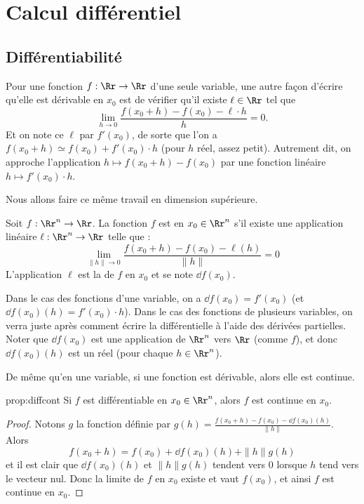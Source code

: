 
\section{Calcul différentiel}
\subsection{Différentiabilité}


Pour une fonction $f : \Rr \to \Rr$ d'une seule variable, une autre façon d'écrire qu'elle est dérivable en $x_0$ est de vérifier qu'il existe $\ell \in \Rr$ tel que 
$$\lim_{h \rightarrow 0} \frac{f(x_0 + h) - f(x_0) - \ell \cdot h}{h} = 0.$$
Et on note ce $\ell$ par $f'(x_0)$, de sorte que l'on a 
$f(x_0+h) \simeq f(x_0) + f'(x_0)\cdot h$ (pour $h$ réel, assez petit).
Autrement dit, on approche l'application $h \mapsto f(x_0+h) - f(x_0)$
par une fonction linéaire $h \mapsto f'(x_0) \cdot h$.

\bigskip

Nous allons faire ce même travail en dimension supérieure.
\begin{definition}{}{}
	Soit $f : \Rr^n \to \Rr$. La fonction $f$ est  en $x_0 \in \Rr^n$ s'il existe une application linéaire $\ell : \Rr^n \to \Rr$ telle que :
	$$\lim_{\|h\| \to 0}  \frac{f(x_0+ h) - f(x_0) - \ell(h)}{\|h\|} = 0$$
	L'application $\ell $ est la  de $f$ en $x_0$ et se note $\dd f(x_0)$.
\end{definition}


Dans le cas des fonctions d'une variable, on a $\dd f(x_0) = f'(x_0)$ (et $\dd f(x_0)(h) = f'(x_0)\cdot h$).
Dans le cas des fonctions de plusieurs variables, on verra juste après comment écrire la différentielle à l'aide des dérivées partielles.
Noter que $\dd f(x_0)$ est une application de $\Rr^n$ vers $\Rr$ (comme $f$), et donc $\dd f(x_0)(h)$ est un réel (pour chaque $h\in\Rr^n$).


\bigskip

De même qu'en une variable, si une fonction est dérivable, alors elle est continue.
\begin{proposition}{}{prop:diffcont}
	Si $f$ est différentiable en $x_0 \in \Rr^n$, alors $f$ est continue en $x_0$.
\end{proposition}

\begin{proof}
	Notons $g$ la fonction définie par $g(h)=\frac{f(x_0+h) - f(x_0) - \dd f(x_0)(h)}{\|h\|}$. Alors 
	$$f(x_0 + h)=f(x_0) + \dd f(x_0)(h) +\|h\|g(h)$$
	et il est clair que $\dd f(x_0)(h)$ et $\|h\|g(h)$ tendent vers $0$ lorsque $h$ tend vers le vecteur nul. Donc la limite de $f$ en $x_0$ existe et vaut $f(x_0)$, et ainsi $f$ est continue en $x_0$.
\end{proof}

